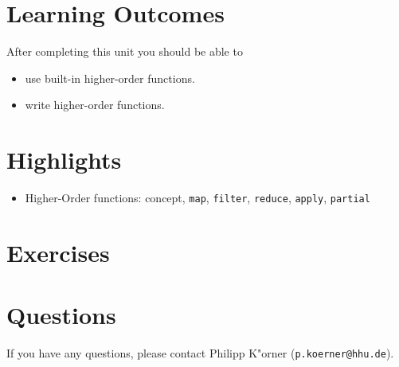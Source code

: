 \documentclass[11pt,a4paper]{article}
\begin{document}
\section{Learning Outcomes}

After completing this unit you should be able to

\begin{itemize}
    \item use built-in higher-order functions.
    \item write higher-order functions.
\end{itemize}

\section{Highlights}

\begin{itemize}
    \item Higher-Order functions: concept, \verb|map|, \verb|filter|, \verb|reduce|, \verb|apply|, \verb|partial|
\end{itemize}



\section{Exercises}



\section*{Questions}
If you have any questions, please contact Philipp K"orner (\texttt{p.koerner@hhu.de}).
\end{document}
